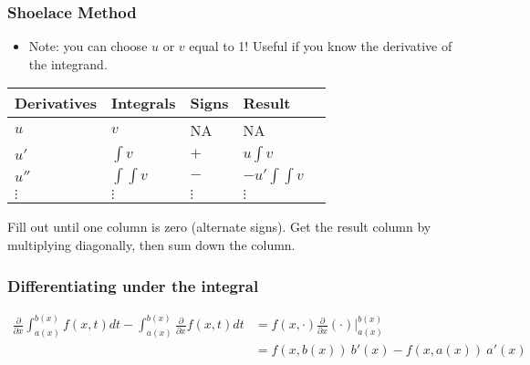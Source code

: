 \hypertarget{shoelace-method}{%
\subsubsection{Shoelace Method}\label{shoelace-method}}

\begin{itemize}
\tightlist
\item
  Note: you can choose \(u\) or \(v\) equal to 1! Useful if you know the
  derivative of the integrand.
\end{itemize}

\begin{longtable}[]{@{}lllll@{}}
\toprule
Derivatives & Integrals & Signs & Result &\tabularnewline
\midrule
\endhead
\(u\) & \(v\) & NA & NA &\tabularnewline
\(u'\) & \(\int v\) & \(+\) & \(u\int v\) &\tabularnewline
\(u''\) & \(\int\int v\) & \(-\) & \(-u'\int\int v\) &\tabularnewline
\(\vdots\) & \(\vdots\) & \(\vdots\) & \(\vdots\) &\tabularnewline
\bottomrule
\end{longtable}

Fill out until one column is zero (alternate signs). Get the result
column by multiplying diagonally, then sum down the column.

\hypertarget{differentiating-under-the-integral}{%
\subsubsection{Differentiating under the
integral}\label{differentiating-under-the-integral}}

\begin{align*}
\frac{\partial}{\partial x} \int_{a(x)}^{b(x)} f(x, t) dt - \int_{a(x)}^{b(x)} \frac{\partial}{\partial x} f(x, t) dt 
&= f(x, \cdot)\frac{\partial}{\partial x}(\cdot) \bigg\rvert_{a(x)}^{b(x)} \\
&= f(x, b(x))~b'(x) - f(x, a(x))~a'(x)
\end{align*}

